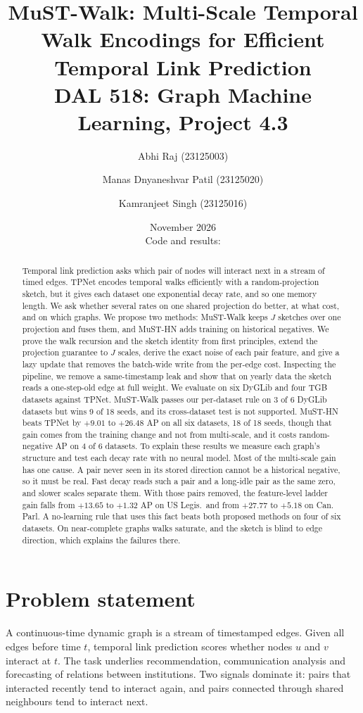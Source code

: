 \documentclass[11pt,a4paper]{article}
\title{\textbf{MuST-Walk: Multi-Scale Temporal Walk Encodings for Efficient Temporal Link Prediction}\\[4pt]
\large DAL 518: Graph Machine Learning, Project 4.3}
\author{Abhi Raj (23125003) \and Manas Dnyaneshvar Patil (23125020) \and Kamranjeet Singh (23125016)}
\date{November 2026\\[3pt]\normalsize Code and results: \repourl}
\theoremstyle{plain}
\theoremstyle{definition}
\begin{document}
\maketitle

\begin{abstract}
Temporal link prediction asks which pair of nodes will interact next in a stream of timed edges. TPNet encodes temporal walks efficiently with a random-projection sketch, but it gives each dataset one exponential decay rate, and so one memory length. We ask whether several rates on one shared projection do better, at what cost, and on which graphs. We propose two methods: MuST-Walk keeps $J$ sketches over one projection and fuses them, and MuST-HN adds training on historical negatives. We prove the walk recursion and the sketch identity from first principles, extend the projection guarantee to $J$ scales, derive the exact noise of each pair feature, and give a lazy update that removes the batch-wide write from the per-edge cost. Inspecting the pipeline, we remove a same-timestamp leak and show that on yearly data the sketch reads a one-step-old edge at full weight. We evaluate on six DyGLib and four TGB datasets against TPNet. MuST-Walk passes our per-dataset rule on 3 of 6 DyGLib datasets but wins 9 of 18 seeds, and its cross-dataset test is not supported. MuST-HN beats TPNet by $+9.01$ to $+26.48$ AP on all six datasets, 18 of 18 seeds, though that gain comes from the training change and not from multi-scale, and it costs random-negative AP on 4 of 6 datasets. To explain these results we measure each graph's structure and test each decay rate with no neural model. Most of the multi-scale gain has one cause. A pair never seen in its stored direction cannot be a historical negative, so it must be real. Fast decay reads such a pair and a long-idle pair as the same zero, and slower scales separate them. With those pairs removed, the feature-level ladder gain falls from $+13.65$ to $+1.32$ AP on US Legis.\ and from $+27.77$ to $+5.18$ on Can. Parl. A no-learning rule that uses this fact beats both proposed methods on four of six datasets. On near-complete graphs walks saturate, and the sketch is blind to edge direction, which explains the failures there.
\end{abstract}

\section{Problem statement}\label{sec:intro}
A continuous-time dynamic graph is a stream of timestamped edges. Given all edges before time $t$, temporal link prediction scores whether nodes $u$ and $v$ interact at $t$. The task underlies recommendation, communication analysis and forecasting of relations between institutions. Two signals dominate it: pairs that interacted recently tend to interact again, and pairs connected through shared neighbours tend to interact next.
\end{document}
